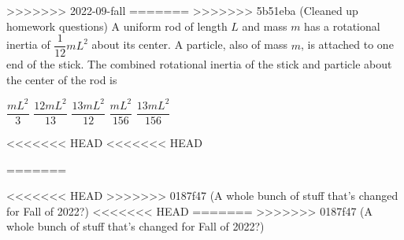 \documentclass{../../oss-apphys-exam}
\begin{document}
\begin{multicols*}{2}
\begin{questions}
>>>>>>> 2022-09-fall
=======
>>>>>>> 5b51eba (Cleaned up homework questions)
    \question A uniform rod of length $L$ and mass $m$ has a rotational inertia
    of $\dfrac1{12}mL^2$ about its center. A particle, also of mass $m$, is
    attached to one end of the stick. The combined rotational inertia of the
    stick and particle about the center of the rod is
    \begin{center}
    \end{center}
    \begin{choices}
      \choice$\dfrac{mL^2}3$
      \choice$\dfrac{12mL^2}{13}$
      \choice$\dfrac{13mL^2}{12}$
      \choice$\dfrac{mL^2}{156}$
      \choice$\dfrac{13mL^2}{156}$
    \end{choices}
<<<<<<< HEAD
<<<<<<< HEAD

=======
    \columnbreak
    
<<<<<<< HEAD
>>>>>>> 0187f47 (A whole bunch of stuff that's changed for Fall of 2022?)
<<<<<<< HEAD
    \columnbreak
=======
>>>>>>> 0187f47 (A whole bunch of stuff that's changed for Fall of 2022?)
    

\end{questions}
\end{multicols*}
\end{document}
